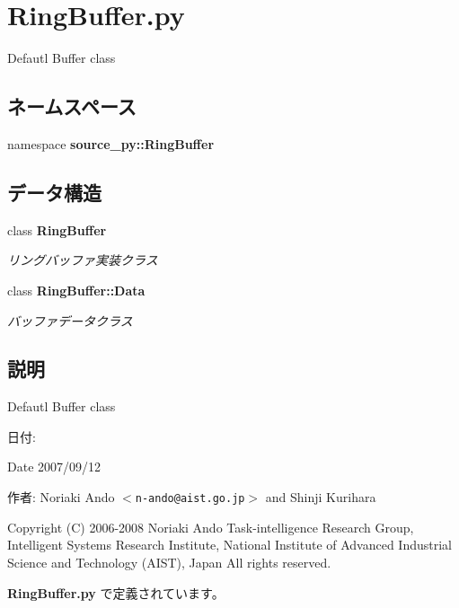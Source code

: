\section{RingBuffer.py}
\label{_ring_buffer_8py}
Defautl Buffer class 

\subsection*{ネームスペース}
\begin{CompactItemize}
\item 
namespace \textbf{source\_\-py::RingBuffer}
\end{CompactItemize}
\subsection*{データ構造}
\begin{CompactItemize}
\item 
class {\bf RingBuffer}
\begin{CompactList}\small\item\em リングバッファ実装クラス \item\end{CompactList}\item 
class {\bf RingBuffer::Data}
\begin{CompactList}\small\item\em バッファデータクラス \item\end{CompactList}\end{CompactItemize}


\subsection{説明}
Defautl Buffer class 

\begin{Desc}
\item[日付:]\end{Desc}
\begin{Desc}
\item[Date]2007/09/12 \end{Desc}
\begin{Desc}
\item[作者:]Noriaki Ando $<${\tt n-ando@aist.go.jp}$>$ and Shinji Kurihara\end{Desc}
Copyright (C) 2006-2008 Noriaki Ando Task-intelligence Research Group, Intelligent Systems Research Institute, National Institute of Advanced Industrial Science and Technology (AIST), Japan All rights reserved. 

 {\bf RingBuffer.py} で定義されています。